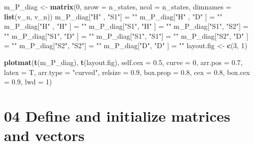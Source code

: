 \documentclass[]{article}
\newenvironment{Shaded}{\begin{snugshade}}{\end{snugshade}}
\newcommand{\KeywordTok}[1]{\textcolor[rgb]{0.13,0.29,0.53}{\textbf{#1}}}
\newcommand{\DataTypeTok}[1]{\textcolor[rgb]{0.13,0.29,0.53}{#1}}
\newcommand{\DecValTok}[1]{\textcolor[rgb]{0.00,0.00,0.81}{#1}}
\newcommand{\FloatTok}[1]{\textcolor[rgb]{0.00,0.00,0.81}{#1}}
\newcommand{\StringTok}[1]{\textcolor[rgb]{0.31,0.60,0.02}{#1}}
\newcommand{\NormalTok}[1]{#1}
\begin{document}
\begin{Shaded}
\begin{Highlighting}[]
\NormalTok{m_P_diag <-}\StringTok{ }\KeywordTok{matrix}\NormalTok{(}\DecValTok{0}\NormalTok{, }\DataTypeTok{nrow =}\NormalTok{ n_states, }\DataTypeTok{ncol =}\NormalTok{ n_states, }\DataTypeTok{dimnames =} \KeywordTok{list}\NormalTok{(v_n, v_n))}
\NormalTok{m_P_diag[}\StringTok{"H"}\NormalTok{ , }\StringTok{"S1"}\NormalTok{] =}\StringTok{ ""} 
\NormalTok{m_P_diag[}\StringTok{"H"}\NormalTok{ , }\StringTok{"D"}\NormalTok{ ] =}\StringTok{ ""} 
\NormalTok{m_P_diag[}\StringTok{"H"}\NormalTok{ , }\StringTok{"H"}\NormalTok{ ] =}\StringTok{ ""} 
\NormalTok{m_P_diag[}\StringTok{"S1"}\NormalTok{, }\StringTok{"H"}\NormalTok{ ] =}\StringTok{ ""} 
\NormalTok{m_P_diag[}\StringTok{"S1"}\NormalTok{, }\StringTok{"S2"}\NormalTok{] =}\StringTok{ ""} 
\NormalTok{m_P_diag[}\StringTok{"S1"}\NormalTok{, }\StringTok{"D"}\NormalTok{ ] =}\StringTok{ ""} 
\NormalTok{m_P_diag[}\StringTok{"S1"}\NormalTok{, }\StringTok{"S1"}\NormalTok{] =}\StringTok{ ""} 
\NormalTok{m_P_diag[}\StringTok{"S2"}\NormalTok{, }\StringTok{"D"}\NormalTok{ ] =}\StringTok{ ""} 
\NormalTok{m_P_diag[}\StringTok{"S2"}\NormalTok{, }\StringTok{"S2"}\NormalTok{] =}\StringTok{ ""} 
\NormalTok{m_P_diag[}\StringTok{"D"}\NormalTok{, }\StringTok{"D"}\NormalTok{  ] =}\StringTok{ ""} 
\NormalTok{layout.fig <-}\StringTok{ }\KeywordTok{c}\NormalTok{(}\DecValTok{3}\NormalTok{, }\DecValTok{1}\NormalTok{)}

\KeywordTok{plotmat}\NormalTok{(}\KeywordTok{t}\NormalTok{(m_P_diag), }\KeywordTok{t}\NormalTok{(layout.fig), }\DataTypeTok{self.cex =} \FloatTok{0.5}\NormalTok{, }\DataTypeTok{curve =} \DecValTok{0}\NormalTok{, }\DataTypeTok{arr.pos =} \FloatTok{0.7}\NormalTok{,  }
        \DataTypeTok{latex =}\NormalTok{ T, }\DataTypeTok{arr.type =} \StringTok{"curved"}\NormalTok{, }\DataTypeTok{relsize =} \FloatTok{0.9}\NormalTok{, }\DataTypeTok{box.prop =} \FloatTok{0.8}\NormalTok{, }
        \DataTypeTok{cex =} \FloatTok{0.8}\NormalTok{, }\DataTypeTok{box.cex =} \FloatTok{0.9}\NormalTok{, }\DataTypeTok{lwd =} \DecValTok{1}\NormalTok{)}
\end{Highlighting}
\end{Shaded}

\section{04 Define and initialize matrices and
vectors}\label{define-and-initialize-matrices-and-vectors}
\end{document}
